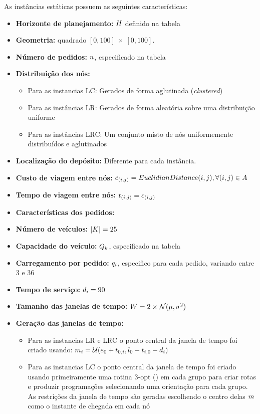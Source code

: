 \documentclass{anpet}
\begin{document}
As instâncias estáticas possuem as seguintes características:
\begin{itemize}
    \item \textbf{Horizonte de planejamento:} $H$ definido na tabela %
    \item \textbf{Geometria:} quadrado $[0, 100]\ \times \ [0, 100]$.
    \item \textbf{Número de pedidos:} $n$, especificado na tabela %
    \item \textbf{Distribuição dos nós:} 
    \begin{itemize}
        \item Para as instancias LC: Gerados de forma aglutinada (\textit{clustered})
        \item Para as instâncias LR: Gerados de forma aleatória sobre uma distribuição uniforme
        \item Para as instâncias LRC: Um conjunto misto de nós uniformemente distribuídos e aglutinados
    \end{itemize}
    \item \textbf{Localização do depósito:} Diferente para cada instância.
    \item \textbf{Custo de viagem entre nós:} $c_{(i,j)} = EuclidianDistance(i,j), \forall (i,j) \in A$
    \item \textbf{Tempo de viagem entre nós:} $t_{(i,j)} = c_{(i,j)}$
    \item \textbf{Características dos pedidos:} 
    \item \textbf{Número de veículos:} $|K| = 25$
    \item \textbf{Capacidade do veículo:} $Q_{k}$, especificado na tabela
    \item \textbf{Carregamento por pedido:} $q_i{}$, especifico para cada pedido, variando entre 3 e 36
    \item \textbf{Tempo de serviço:} $d_{i{}} = 90$ 
    \item \textbf{Tamanho das janelas de tempo:} $W = 2 \times \mathcal{N}(\mu,\sigma^2)$
    \item \textbf{Geração das janelas de tempo:} 
    \begin{itemize}
        \item Para as instancias LR e LRC o ponto central da janela de tempo foi criado usando: $m_i{} =\mathcal{U}(e_0 + t_{0,i},l_0 - t_{i,0} - d_i)$
        \item Para as instancias LC o ponto central da janela de tempo foi criado usando primeiramente uma rotina 3-opt (\parencite{lin_computer_1965}) em cada grupo para criar rotas e produzir programações selecionando uma orientação para cada grupo. As restrições da janela de tempo são geradas escolhendo o centro delas $m$ como o instante de chegada em cada nó

\end{itemize}
\end{itemize}
\end{document}
